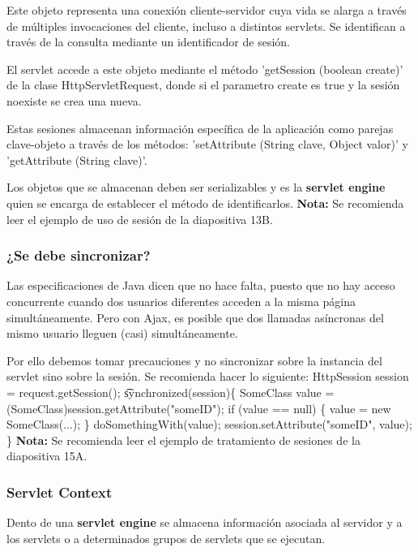 \documentclass{apuntes}
\begin{document}
Este objeto representa una conexión cliente-servidor cuya vida se alarga a través de múltiples invocaciones del cliente, incluso a distintos servlets. Se identifican a través de la consulta mediante un identificador de sesión.

El servlet accede a este objeto mediante el método 'getSession (boolean create)' de la clase HttpServletRequest, donde si el parametro create es true y la sesión noexiste se crea una nueva.

Estas sesiones almacenan información específica de la aplicación como parejas clave-objeto a través de los métodos: 'setAttribute (String clave, Object valor)' y 'getAttribute (String clave)'.

Los objetos que se almacenan deben ser serializables y es la \textbf{servlet engine} quien se encarga de establecer el método de identificarlos.
\textbf{Nota:} Se recomienda leer el ejemplo de uso de sesión de  la diapositiva 13B.
\subsubsection{¿Se debe sincronizar?}
Las especificaciones de Java dicen que no hace falta, puesto que no hay acceso concurrente cuando dos usuarios diferentes acceden a la misma página simultáneamente. Pero con Ajax, es posible que dos llamadas asíncronas del mismo usuario lleguen (casi) simultáneamente.

Por ello debemos tomar precauciones y no sincronizar sobre la instancia del servlet sino sobre la sesión.
Se recomienda hacer lo siguiente:\newline
 \newline
 HttpSession session = request.getSession();\newline
\t synchronized(session)\newline \{\newline
SomeClass value =(SomeClass)session.getAttribute("someID");\newline
if (value == null) \{\newline
value = new SomeClass(...);\newline
\}\newline
doSomethingWith(value);\newline
session.setAttribute("someID", value);
\}\newline
 \newline
\textbf{Nota:} Se recomienda leer el ejemplo de tratamiento de sesiones de  la diapositiva 15A.
\subsubsection{Servlet Context}
Dento de una \textbf{servlet engine} se almacena información asociada al servidor y a los servlets o a determinados grupos de servlets que se ejecutan.
\end{document}
